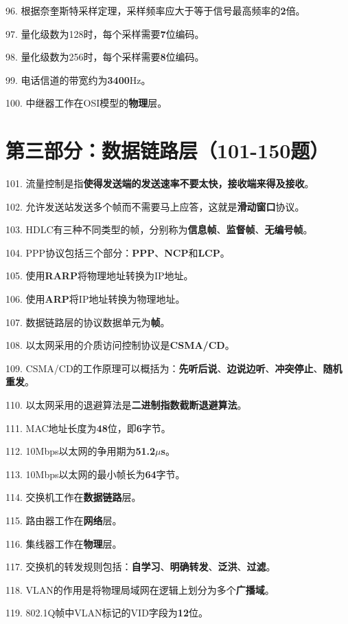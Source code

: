 \documentclass[12pt,a4paper,openany]{ctexbook}
\begin{document}
96. 根据奈奎斯特采样定理，采样频率应大于等于信号最高频率的\textbf{2}倍。

97. 量化级数为128时，每个采样需要\textbf{7}位编码。

98. 量化级数为256时，每个采样需要\textbf{8}位编码。

99. 电话信道的带宽约为\textbf{3400}Hz。

100. 中继器工作在OSI模型的\textbf{物理}层。

\section{第三部分：数据链路层（101-150题）}

101. 流量控制是指\textbf{使得发送端的发送速率不要太快，接收端来得及接收}。

102. 允许发送站发送多个帧而不需要马上应答，这就是\textbf{滑动窗口}协议。

103. HDLC有三种不同类型的帧，分别称为\textbf{信息帧}、\textbf{监督帧}、\textbf{无编号帧}。

104. PPP协议包括三个部分：\textbf{PPP}、\textbf{NCP}和\textbf{LCP}。

105. 使用\textbf{RARP}将物理地址转换为IP地址。

106. 使用\textbf{ARP}将IP地址转换为物理地址。

107. 数据链路层的协议数据单元为\textbf{帧}。

108. 以太网采用的介质访问控制协议是\textbf{CSMA/CD}。

109. CSMA/CD的工作原理可以概括为：\textbf{先听后说}、\textbf{边说边听}、\textbf{冲突停止}、\textbf{随机重发}。

110. 以太网采用的退避算法是\textbf{二进制指数截断退避算法}。

111. MAC地址长度为\textbf{48}位，即\textbf{6}字节。

112. 10Mbps以太网的争用期为\textbf{51.2$\mu$s}。

113. 10Mbps以太网的最小帧长为\textbf{64}字节。

114. 交换机工作在\textbf{数据链路}层。

115. 路由器工作在\textbf{网络}层。

116. 集线器工作在\textbf{物理}层。

117. 交换机的转发规则包括：\textbf{自学习}、\textbf{明确转发}、\textbf{泛洪}、\textbf{过滤}。

118. VLAN的作用是将物理局域网在逻辑上划分为多个\textbf{广播域}。

119. 802.1Q帧中VLAN标记的VID字段为\textbf{12}位。
\end{document}
